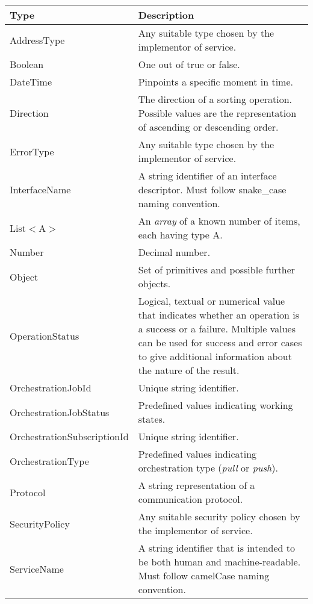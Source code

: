\documentclass[a4paper]{arrowhead}
\newcommand{\pdef}[1]{{\textcolor{ArrowheadGrey}{#1\label{sec:model:primitives:#1}\label{sec:model:primitives:#1s}\label{sec:model:primitives:#1es}}}}
\begin{document}
\begin{table}[ht!]
\begin{tabularx}{\textwidth}{| p{4.3cm} | X |} \hline
\rowcolor{gray!33} Type & Description \\ \hline
\pdef{AddressType}      & Any suitable type chosen by the implementor of service. \\ \hline
\pdef{Boolean}          & One out of true or false. \\ \hline
\pdef{DateTime}         & Pinpoints a specific moment in time. \\ \hline
\pdef{Direction}        & The direction of a sorting operation. Possible values are the representation of ascending or descending order. \\ \hline
\pdef{ErrorType}        & Any suitable type chosen by the implementor of service. \\ \hline
\pdef{InterfaceName}& A string identifier of an interface descriptor. Must follow snake\_case naming convention. \\ \hline
\pdef{List}$<$A$>$      & An \textit{array} of a known number of items, each having type A. \\ \hline
\pdef{Number}           & Decimal number. \\ \hline
\pdef{Object}           & Set of primitives and possible further objects. \\ \hline
\pdef{OperationStatus}  & Logical, textual or numerical value that indicates whether an operation is a success or a failure. Multiple values can be used for success and error cases to give additional information about the nature of the result. \\ \hline
\pdef{OrchestrationJobId} & Unique string identifier. \\ \hline
\pdef{OrchestrationJobStatus}  & Predefined values indicating working states. \\ \hline
\pdef{OrchestrationSubscriptionId} & Unique string identifier. \\ \hline
\pdef{OrchestrationType}  & Predefined values indicating orchestration type (\textit{pull} or \textit{push}). \\ \hline
\pdef{Protocol}         & A string representation of a communication protocol. \\ \hline
\pdef{SecurityPolicy}   & Any suitable security policy chosen by the implementor of service. \\ \hline
\pdef{ServiceName}             & A string identifier that is intended to be both human and machine-readable. Must follow camelCase naming convention. \\ \hline

\end{tabularx}
\end{table}
\end{document}

